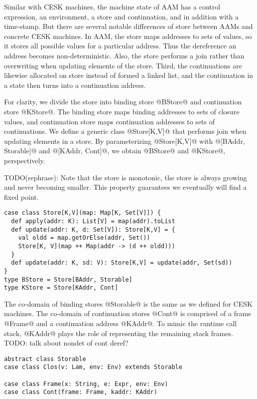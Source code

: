 \documentclass[acmsmall,review,anonymous]{acmart}\settopmatter{printfolios=true,printccs=false,printacmref=false}
\begin{document}
Similar with CESK machines, the machine state of AAM has a control expression,
an environment, a store and continuation, and in addition with a time-stamp.
But there are several notable differences of store between AAMs and concrete CESK machines.
In AAM, the store maps addresses to sets of values, so it stores all possible values
for a particular address. Thus the dereference an address becomes non-deterministic.
Also, the store performs a join rather than overwriting when updating elements of the store.
Third, the continuations are likewise allocated on store instead of formed a linked list,
and the continuation in a state then turns into a continuation address.

For clarity, we divide the store into binding store @BStore@ and continuation store @KStore@. 
The binding store maps binding addresses to sets of closure values, and continuation store maps
continuation addresses to sets of continuations.
We define a generic class @Store[K,V]@ that performs join when updating elements
in a store. By parameterizing @Store[K,V]@ with @[BAddr, Storable]@ and 
@[KAddr, Cont]@, we obtain @BStore@ and @KStore@, perspectively.

TODO(rephrase): Note that the store is monotonic, the store is always growing and never becoming 
smaller. This property guarantees we eventually will find a fixed point.

\begin{lstlisting}
case class Store[K,V](map: Map[K, Set[V]]) {
  def apply(addr: K): List[V] = map(addr).toList
  def update(addr: K, d: Set[V]): Store[K,V] = {
    val oldd = map.getOrElse(addr, Set())
    Store[K, V](map ++ Map(addr -> (d ++ oldd)))
  }
  def update(addr: K, sd: V): Store[K,V] = update(addr, Set(sd))
}
type BStore = Store[BAddr, Storable]
type KStore = Store[KAddr, Cont]
\end{lstlisting}

The co-domain of binding stores @Storable@ is the same
as we defined for CESK machines.
The co-domain of continuation stores @Cont@ is comprised of 
a frame @Frame@ and a continuation address @KAddr@.
To mimic the runtime call stack, @KAddr@ plays the role of
representing the remaining stack frames.
TODO: talk about nondet of cont deref?

\begin{lstlisting}
abstract class Storable 
case class Clos(v: Lam, env: Env) extends Storable

case class Frame(x: String, e: Expr, env: Env)
case class Cont(frame: Frame, kaddr: KAddr)
\end{lstlisting}
\end{document}
